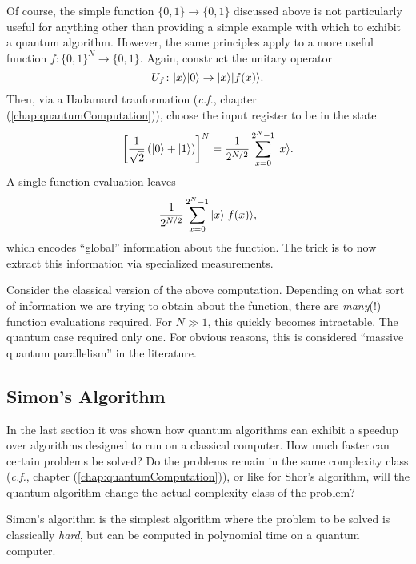 Of course, the simple function $\lbrace 0,1\rbrace\to\lbrace 0,1\rbrace$
discussed above is not particularly useful for anything other than
providing a simple example with which to exhibit a quantum algorithm.
However, the same principles apply to a more useful function
$f\colon\lbrace 0,1\rbrace^N\to\lbrace 0,1\rbrace$.
Again, construct the unitary operator
\begin{equation}
U_f\colon{|{x}\rangle}{|{0}\rangle}\to{|{x}\rangle}{|{f(x)}\rangle}.
\end{equation}
Then, via a Hadamard tranformation ({\it c.f.}, chapter
(\ref{chap:quantumComputation})), choose the input register to 
be in the state
\begin{equation}
\left[\frac{1}{\sqrt{2}}\left({|{0}\rangle}+{|{1}\rangle}\right)\right]^N
= \frac{1}{2^{N/2}}\sum_{x=0}^{2^N-1}{|{x}\rangle}.
\end{equation}
A single function evaluation leaves 
\begin{equation}
    \frac{1}{2^{N/2}}\sum_{x=0}^{2^N-1}{|{x}\rangle}{|{f(x)}\rangle},
\end{equation}
which encodes ``global'' information about the function.
The trick is to now extract this information via specialized
measurements.

Consider the classical version of the above computation.
Depending on what sort of information we are trying to obtain
about the function, there are \emph{many}(!) function evaluations
required.  For $N\gg 1$, this quickly becomes intractable. 
The quantum case required only one.  For obvious reasons, this is 
considered ``massive quantum parallelism'' in the literature.

\subsection{Simon's Algorithm}

In the last section it was shown how quantum algorithms can
exhibit a speedup over algorithms designed to run on a classical
computer.  How much faster can certain problems be solved?
Do the problems remain in the same complexity class ({\it c.f.},
chapter (\ref{chap:quantumComputation})), or like for Shor's 
algorithm, will the quantum algorithm change the actual 
complexity class of the problem?

Simon's algorithm\cite{Simon:97} 
is the simplest algorithm where the problem to
be solved is classically \emph{hard}, but can be computed in
polynomial time on a quantum computer.

